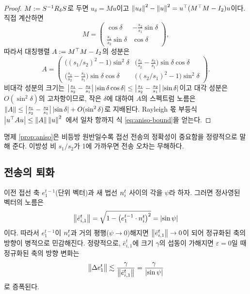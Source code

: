 \begin{proof}
$M := S^{-1}R_\delta S$로 두면 $u_\delta = Mu$이고
$\left\lVert u_\delta \right\rVert^2-\left\lVert u \right\rVert^2 = u^{\top}(M^{\top} M - I_2)u$이다. 직접 계산하면
\[
  M = \begin{pmatrix}
    \cos\delta & -\frac{s_2}{s_1}\sin\delta\\[0.3em]
    \frac{s_1}{s_2}\sin\delta & \cos\delta
  \end{pmatrix},
\]
따라서 대칭행렬 $A := M^{\top} M - I_2$의 성분은
\[
  A = \begin{pmatrix}
    \bigl((s_1/s_2)^2-1\bigr)\sin^2\delta
      & \bigl(\frac{s_1}{s_2}-\frac{s_2}{s_1}\bigr)\sin\delta\cos\delta\\[0.3em]
    \bigl(\frac{s_1}{s_2}-\frac{s_2}{s_1}\bigr)\sin\delta\cos\delta
      & \bigl((s_2/s_1)^2-1\bigr)\sin^2\delta
  \end{pmatrix}.
\]
비대각 성분의 크기는
$\bigl\lvert\frac{s_1}{s_2}-\frac{s_2}{s_1}\bigr\rvert\left\lvert \sin\delta\cos\delta \right\rvert
\le \bigl\lvert\frac{s_1}{s_2}-\frac{s_2}{s_1}\bigr\rvert\left\lvert \sin\delta \right\rvert$이고 대각
성분은 $O(\sin^2\delta)$의 고차항이므로, 작은 $\delta$에 대하여 $A$의 스펙트럼 노름은
$\left\lVert A \right\rVert \le \bigl\lvert\frac{s_1}{s_2}-\frac{s_2}{s_1}\bigr\rvert\left\lvert \sin\delta \right\rvert
+ O(\sin^2\delta)$로 지배된다. Rayleigh 몫 부등식
$\left\lvert u^{\top} A u \right\rvert\le\left\lVert A \right\rVert\left\lVert u \right\rVert^2$~\citep[제 4.2절]{horn2013_matrix}에서 일차
항까지 식 \eqref{eq:aniso-bound}을 얻는다.
\end{proof}

명제 \ref{prop:aniso}은 비등방 원반일수록 접선 전송의 정확성이 중요함을 정량적으로
말해 준다. 이방성 비 $s_1/s_2$가 1에 가까우면 전송 오차는 무해하다.

\subsection{전송의 퇴화}

\begin{proposition}
\label{prop:degeneracy}
이전 접선 축 $e^{t-1}_1$(단위 벡터)과 새 법선 $n^t_i$ 사이의 각을 $\psi$라 하자.
그러면 정사영된 벡터의 노름은
\begin{equation}
  \left\lVert \bar e^t_{i,1} \right\rVert = \sqrt{1-\bigl(e^{t-1}_1\cdot n^t_i\bigr)^2} = \left\lvert \sin\psi \right\rvert
  \label{eq:sin-psi}
\end{equation}
이다. 따라서 $e^{t-1}_1$이 $n^t_i$과 거의 평행($\psi\to0$)해지면
$\left\lVert \bar e^t_{i,1} \right\rVert\to0$이 되어 정규화된 축의 방향이 병적으로 민감해진다.
정량적으로, $\bar e^t_{i,1}$에 크기 $\gamma$의 섭동이 가해지면 $\varepsilon=0$일 때
정규화된 축의 방향 변화는
\begin{equation}
  \left\lVert \Delta e^t_1 \right\rVert \lesssim \frac{\gamma}{\left\lVert \bar e^t_{i,1} \right\rVert} = \frac{\gamma}{\left\lvert \sin\psi \right\rvert}
  \label{eq:amplification}
\end{equation}
로 증폭된다.
\end{proposition}

